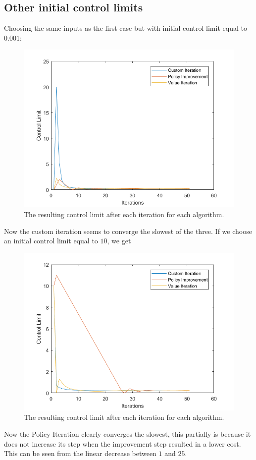 \subsection{Other initial control limits}
Choosing the same inputs as the first case but with initial control limit equal to $0.001$:
\begin{figure}[H]
\centering
\includegraphics[width=\textwidth]{Plots/CL Weibull2-2 Discount-1 Start-0.001.png}
\caption{The resulting control limit after each iteration for each algorithm.}
\end{figure}
Now the custom iteration seems to converge the slowest of the three.
If we choose an initial control limit equal to $10$, we get
\begin{figure}[H]
\centering
\includegraphics[width=\textwidth]{Plots/CL Weibull2-2 Discount-1 Start-10.png}
\caption{The resulting control limit after each iteration for each algorithm.}
\end{figure}
Now the Policy Iteration clearly converges the slowest, this partially is because it does not increase its step when the improvement step resulted in a lower cost.
This can be seen from the linear decrease between $1$ and $25$.
